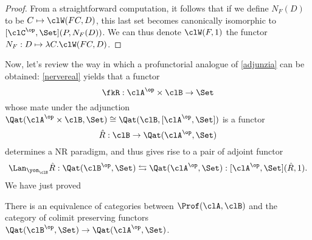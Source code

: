 \begin{proof}
	From a straightforward computation, it follows that if we define $N_F(D)$ to be $C\mapsto \clW(F C,D)$, this last set becomes canonically isomorphic to $[\clC^\op,\Set](P,N_F(D))$. We can thus denote $\clW(F,1)$ the functor $N_F : D\mapsto \lambda C.\clW(F C,D)$.
\end{proof}
Now, let's review the way in which a profunctorial analogue of \eqref{adjunzia} can be obtained: \autoref{nervereal} yields that a functor 
\[ \fkR : \clA^\op\times \clB \to \Set \]
whose mate under the adjunction $\Qat(\clA^\op\times \clB ,\Set)\cong\Qat(\clB,[\clA^\op,\Set])$ is a functor 
\[ \hat R : \clB \to \Qat(\clA^\op,\Set) \]
determines a NR paradigm, and thus gives rise to a pair of adjoint functor 
\[ \Lan_{\yon_\clB} \hat R : \Qat(\clB^\op,\Set) \leftrightarrows \Qat(\clA^\op,\Set) : [\clA^\op,\Set](\hat R,1). \]
We have just proved 
\begin{proposition}\label{equ_prof_cocont}
  There is an equivalence of categories between $\Prof(\clA,\clB)$ and the category of colimit preserving functors $\Qat(\clB^\op,\Set) \to \Qat(\clA^\op,\Set)$.
\end{proposition}
